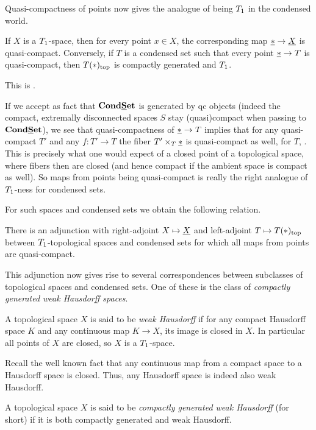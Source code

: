 Quasi-compactness of points now gives the analogue of being ${T_1}$ in the condensed world.
\begin{lemma}
	\label{lemma: T1-spaces and quascompact points}
	
	If $X$ is a ${T_1}$-space, then for every point $x\in X$, the corresponding map $\underline{\ast}\to \underline{X}$ is quasi-compact. Conversely, if $T$ is a condensed set such that every point $\underline{\ast}\to T$ is quasi-compact, then ${T(\ast)_\mathrm{top}}$ is compactly generated and ${T_1}$.
\end{lemma}
\begin{shortproof}
	This is \cite[Prop. 2.15]{condenseddotpdf}.
\end{shortproof}

\begin{remark}
	If we accept as fact that ${{{\mathbf{Cond}}}{{\mathbf{\underline{S}et}}}}$ is generated by qc objects (indeed the compact, extremally disconnected spaces $S$ stay (quasi)compact when passing to ${{{\mathbf{Cond}}}{{\mathbf{\underline{S}et}}}}$), we see that quasi-compactness of $\underline{\ast} \to T$ implies that for any quasi-compact $T'$ and any $f\colon T'\to T$ the fiber $T'\times_T \underline{\ast}$ is quasi-compact as well, \ie for $T$, . This is precisely what one would expect of a closed point of a topological space, where fibers then are closed (and hence compact if the ambient space is compact as well). So maps from points being quasi-compact is really the right analogue of ${T_1}$-ness for condensed sets.
\end{remark}

For such spaces and condensed sets we obtain the following relation.
\begin{corollary}
	There is an adjunction with right-adjoint $X\mapsto \underline{X}$ and left-adjoint $T\mapsto {T(\ast)_\mathrm{top}}$ between ${T_1}$-topological spaces and condensed sets for which all maps from points are quasi-compact.
\end{corollary}

This adjunction now gives rise to several correspondences between subclasses of topological spaces and condensed sets. One of these is the class of \emph{compactly generated weak Hausdorff spaces}.
\begin{definition}
	A topological space $X$ is said to be \emph{weak Hausdorff} if for any compact Hausdorff space $K$ and any continuous map $K\to X$, its image is closed in $X$. In particular all points of $X$ are closed, so $X$ is a ${T_1}$-space.
	
	Recall the well known fact that any continuous map from a compact space to a Hausdorff space is closed. Thus, any Hausdorff space is indeed also weak Hausdorff.
	
	A topological space $X$ is said to be \emph{compactly generated weak Hausdorff} (\CGWH for short) if it is both compactly generated and weak Hausdorff.
\end{definition}

